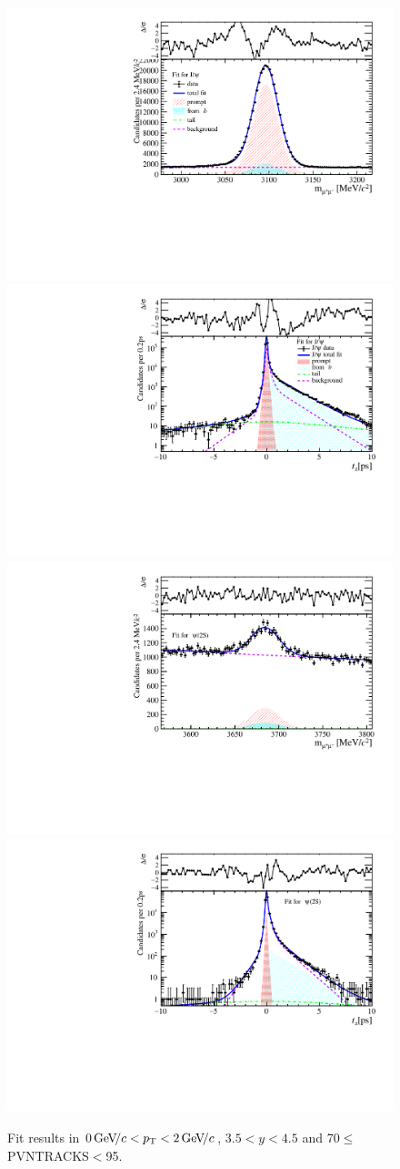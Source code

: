 \begin{figure}[H]
\begin{center}
\includegraphics[width=0.47\linewidth]{pdf/Jpsi/drawmass/n4y3pt1.pdf}
\includegraphics[width=0.47\linewidth]{pdf/Jpsi/2DFit/n4y3pt1.pdf}
\vspace*{-0.5cm}
\includegraphics[width=0.47\linewidth]{pdf/Psi2S/drawmass/n4y3pt1.pdf}
\includegraphics[width=0.47\linewidth]{pdf/Psi2S/2DFit/n4y3pt1.pdf}
\vspace*{-0.5cm}
\end{center}
\caption{Fit results in $0\text{\,Ge\kern -0.1em V\!/}c<p_{\mathrm{T}}<2\text{\,Ge\kern -0.1em V\!/}c$, $3.5<y<4.5$ and 70$\leq$PVNTRACKS$<$95.}
\label{Fitn4y3pt1}
\end{figure}
